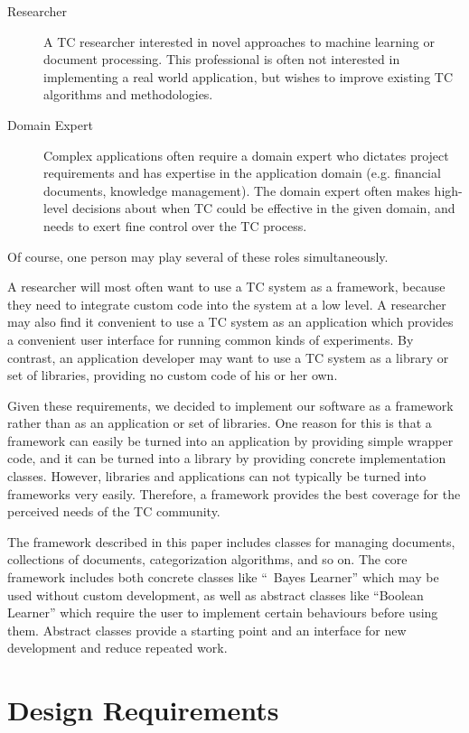 \begin{singlespace}
\begin{description}
\item[Researcher] A TC researcher interested in novel approaches to
machine learning or document processing.  This professional is often
not interested in implementing a real world application, but wishes to
improve existing TC algorithms and methodologies.

\item[Domain Expert] Complex applications often require a domain
expert who dictates project requirements and has expertise in the
application domain (e.g. financial documents, knowledge management).
The domain expert often makes high-level decisions about when TC could
be effective in the given domain, and needs to exert fine control over
the TC process.
\end{description}

Of course, one person may play several of these roles simultaneously.

A researcher will most often want to use a TC system as a framework,
because they need to integrate custom code into the system at a low
level.  A researcher may also find it convenient to use a TC system as
an application which provides a convenient user interface for running
common kinds of experiments.  By contrast, an application developer
may want to use a TC system as a library or set of libraries,
providing no custom code of his or her own.

Given these requirements, we decided to implement our software as a
framework rather than as an application or set of libraries.  One
reason for this is that a framework can easily be turned into an
application by providing simple wrapper code, and it can be
turned into a library by providing concrete implementation classes.
However, libraries and applications can not typically be turned into
frameworks very easily.  Therefore, a framework provides the best
coverage for the perceived needs of the TC community.

The framework described in this paper includes classes for managing
documents, collections of documents, categorization algorithms, and so
on.  The core framework includes both concrete classes like ``\naive\
Bayes Learner'' which may be used without custom development, as
well as abstract classes like ``Boolean Learner'' which require the
user to implement certain behaviours before using them.  Abstract
classes provide a starting point and an interface for new development
and reduce repeated work.


\section{Design Requirements}


\end{singlespace}
